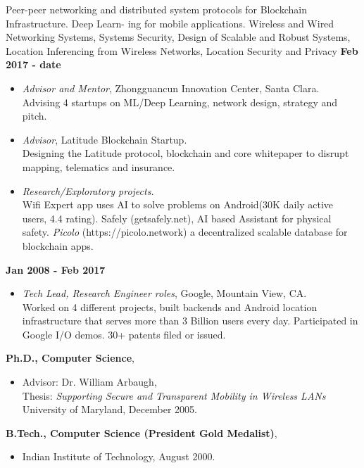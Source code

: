 \begin{resume}
\vspace{0.1in}

Peer-peer networking and distributed system protocols for Blockchain Infrastructure. Deep Learn- ing for mobile applications. Wireless and Wired Networking Systems, Systems Security, Design of Scalable and Robust Systems, Location Inferencing from Wireless Networks, Location Security and Privacy
{\bf Feb 2017 - date}
    \begin{itemize}
        \item [] {\it Advisor and Mentor}, Zhongguancun Innovation Center, Santa Clara. \\
            Advising 4 startups on ML/Deep Learning, network design, strategy and pitch.
        \item [] {\it Advisor}, Latitude Blockchain Startup. \\ 
            Designing the Latitude protocol, blockchain and core whitepaper to disrupt mapping, telematics and insurance.
        \item [] {\it Research/Exploratory projects.} \\
            Wifi Expert app uses AI to solve problems on Android(30K daily active users, 4.4 rating).
            Safely (getsafely.net), AI based Assistant for physical safety. {\em Picolo} (https://picolo.network) a decentralized scalable database for blockchain apps.
    \end{itemize}

{\bf Jan 2008 - Feb 2017}
    \begin{itemize}
         \item[] {\it Tech Lead, Research Engineer roles}, Google, Mountain View, CA.\\
             Worked on 4 different projects, built backends and Android location infrastructure that serves more than 3
             Billion users every day. Participated in Google I/O demos. 30+ patents filed or issued.
    \end{itemize}

{\bf Ph.D., Computer Science},
    \begin{itemize}
         \item[] Advisor: Dr. William Arbaugh, \\
		 Thesis: {\em Supporting Secure and Transparent Mobility in Wireless LANs} \\
                 University of Maryland, December 2005.
    \end{itemize}
{\bf B.Tech., Computer Science (President Gold Medalist)},
    \begin{itemize}
        \item[] Indian Institute of Technology, August 2000.
    \end{itemize}


\end{resume}
